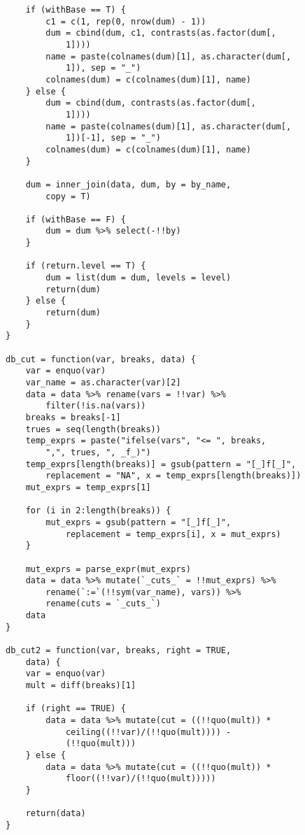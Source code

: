 \begin{lstlisting}
    if (withBase == T) {
        c1 = c(1, rep(0, nrow(dum) - 1))
        dum = cbind(dum, c1, contrasts(as.factor(dum[, 
            1])))
        name = paste(colnames(dum)[1], as.character(dum[, 
            1]), sep = "_")
        colnames(dum) = c(colnames(dum)[1], name)
    } else {
        dum = cbind(dum, contrasts(as.factor(dum[, 
            1])))
        name = paste(colnames(dum)[1], as.character(dum[, 
            1])[-1], sep = "_")
        colnames(dum) = c(colnames(dum)[1], name)
    }
    
    dum = inner_join(data, dum, by = by_name, 
        copy = T)
    
    if (withBase == F) {
        dum = dum %>% select(-!!by)
    }
    
    if (return.level == T) {
        dum = list(dum = dum, levels = level)
        return(dum)
    } else {
        return(dum)
    }
}

db_cut = function(var, breaks, data) {
    var = enquo(var)
    var_name = as.character(var)[2]
    data = data %>% rename(vars = !!var) %>% 
        filter(!is.na(vars))
    breaks = breaks[-1]
    trues = seq(length(breaks))
    temp_exprs = paste("ifelse(vars", "<= ", breaks, 
        ",", trues, ", _f_)")
    temp_exprs[length(breaks)] = gsub(pattern = "[_]f[_]", 
        replacement = "NA", x = temp_exprs[length(breaks)])
    mut_exprs = temp_exprs[1]
    
    for (i in 2:length(breaks)) {
        mut_exprs = gsub(pattern = "[_]f[_]", 
            replacement = temp_exprs[i], x = mut_exprs)
    }
    
    mut_exprs = parse_expr(mut_exprs)
    data = data %>% mutate(`_cuts_` = !!mut_exprs) %>% 
        rename(`:=`(!!sym(var_name), vars)) %>% 
        rename(cuts = `_cuts_`)
    data
}

db_cut2 = function(var, breaks, right = TRUE, 
    data) {
    var = enquo(var)
    mult = diff(breaks)[1]
    
    if (right == TRUE) {
        data = data %>% mutate(cut = ((!!quo(mult)) * 
            ceiling((!!var)/(!!quo(mult)))) - 
            (!!quo(mult)))
    } else {
        data = data %>% mutate(cut = ((!!quo(mult)) * 
            floor((!!var)/(!!quo(mult)))))
    }
    
    return(data)
}


\end{lstlisting}
